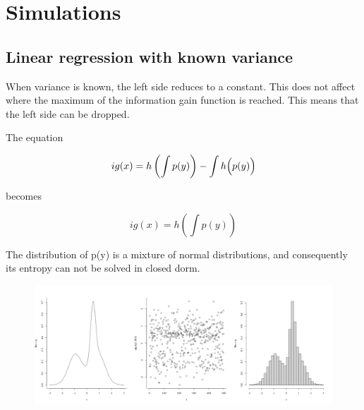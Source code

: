 \section{Simulations}


\subsection{Linear regression with known variance}

When variance is known, the left side reduces to a constant. This does not affect where the maximum of the information gain function is reached. This means that the left side can be dropped.

The equation

\begin{equation}
	ig(x) = h \left(\int p(y) \right)  - \int h \Bigl( p(y) \Bigl)
\end{equation}

becomes

\begin{equation}
	ig(x) = h \left(\int p(y) \right)
\end{equation}

The distribution of p(y) is a mixture of normal distributions, and consequently its entropy can not be solved in closed dorm.

\begin{figure}
	\begin{center}
		\includegraphics[width=5in]{Parts/TheoreticalBackground/Figs/etnropyApproxHist.png}
	\end{center}
	\caption{}
\end{figure}